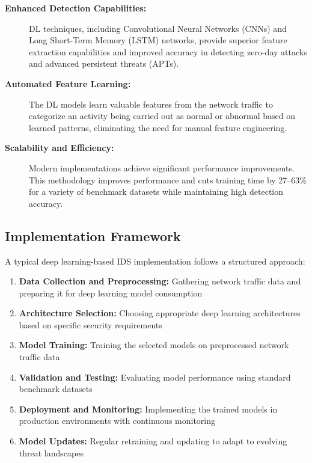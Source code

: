 \documentclass[16pt]{report}
\begin{document}
\begin{description}
    \item[\textbf{Enhanced Detection Capabilities:}] DL techniques, including Convolutional Neural Networks (CNNs) and Long Short-Term Memory (LSTM) networks, provide superior feature extraction capabilities and improved accuracy in detecting zero-day attacks and advanced persistent threats (APTs).

    \item[\textbf{Automated Feature Learning:}] The DL models learn valuable features from the network traffic to categorize an activity being carried out as normal or abnormal based on learned patterns, eliminating the need for manual feature engineering.

    \item[\textbf{Scalability and Efficiency:}] Modern implementations achieve significant performance improvements. This methodology improves performance and cuts training time by 27–63\% for a variety of benchmark datasets while maintaining high detection accuracy.
\end{description}

\subsection{Implementation Framework}
A typical deep learning-based IDS implementation follows a structured approach:

\begin{enumerate}
    \item \textbf{Data Collection and Preprocessing:} Gathering network traffic data and preparing it for deep learning model consumption
    \item \textbf{Architecture Selection:} Choosing appropriate deep learning architectures based on specific security requirements
    \item \textbf{Model Training:} Training the selected models on preprocessed network traffic data
    \item \textbf{Validation and Testing:} Evaluating model performance using standard benchmark datasets
    \item \textbf{Deployment and Monitoring:} Implementing the trained models in production environments with continuous monitoring
    \item \textbf{Model Updates:} Regular retraining and updating to adapt to evolving threat landscapes
\end{enumerate}
\end{document}
